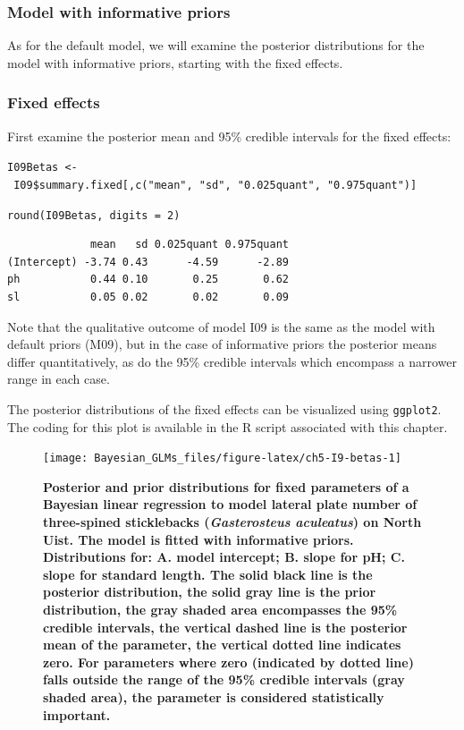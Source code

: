\documentclass[
]{book}
\begin{document}
\hypertarget{pois-inf-priors}{%
\subsubsection{Model with informative priors}\label{pois-inf-priors}}

As for the default model, we will examine the posterior distributions for the model with informative priors, starting with the fixed effects.

\hypertarget{fixed-effects-2}{%
\subsubsection{Fixed effects}\label{fixed-effects-2}}

First examine the posterior mean and 95\% credible intervals for the fixed effects:

\texttt{I09Betas\ \textless{}-\ I09\$summary.fixed{[},c("mean",\ "sd",\ "0.025quant",\ "0.975quant"){]}}

\texttt{round(I09Betas,\ digits\ =\ 2)}

\begin{verbatim}
             mean   sd 0.025quant 0.975quant
(Intercept) -3.74 0.43      -4.59      -2.89
ph           0.44 0.10       0.25       0.62
sl           0.05 0.02       0.02       0.09
\end{verbatim}

Note that the qualitative outcome of model I09 is the same as the model with default priors (M09), but in the case of informative priors the posterior means differ quantitatively, as do the 95\% credible intervals which encompass a narrower range in each case.

The posterior distributions of the fixed effects can be visualized using \texttt{ggplot2}. The coding for this plot is available in the R script associated with this chapter.



\begin{figure}

{\centering \texttt{[image: Bayesian\_GLMs\_files/figure-latex/ch5-I9-betas-1]} 

}

\caption{\textbf{Posterior and prior distributions for fixed parameters of a Bayesian linear regression to model lateral plate number of three-spined sticklebacks (\emph{Gasterosteus aculeatus}) on North Uist. The model is fitted with informative priors. Distributions for: A. model intercept; B. slope for pH; C. slope for standard length. The solid black line is the posterior distribution, the solid gray line is the prior distribution, the gray shaded area encompasses the 95\% credible intervals, the vertical dashed line is the posterior mean of the parameter, the vertical dotted line indicates zero. For parameters where zero (indicated by dotted line) falls outside the range of the 95\% credible intervals (gray shaded area), the parameter is considered statistically important.}}\label{fig:ch5-I9-betas}
\end{figure}
\end{document}
